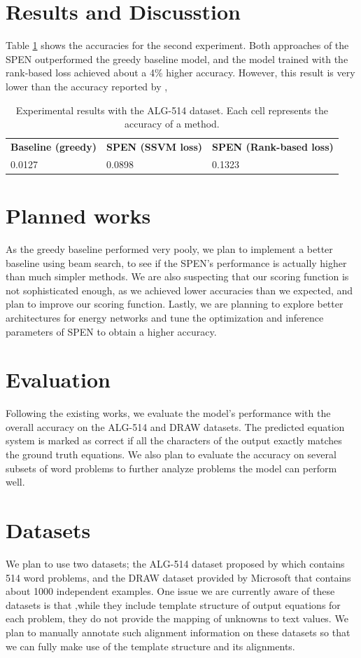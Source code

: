 \documentclass[11pt,letterpaper]{article}
\begin{document}
\section{Results and Discusstion}
Table \ref{result} shows the accuracies for the second experiment. Both approaches of the SPEN outperformed the greedy baseline model, and the model trained with the rank-based loss achieved about a 4\% higher accuracy. However, this result is very lower than the accuracy reported by \cite{Kushman2014LearningTA},
\begin{table}[]
\centering
\caption{Experimental results with the ALG-514 dataset. Each cell represents the accuracy of a method.}
\label{result}
\begin{tabular}{lll}
\textbf{Baseline (greedy)} & \textbf{SPEN (SSVM loss)} & \textbf{SPEN (Rank-based loss)} \\
0.0127                     & 0.0898                    & 0.1323                         
\end{tabular}
\end{table}
\section{Planned works}
As the greedy baseline performed very pooly, we plan to implement a better baseline using beam search, to see if the SPEN's performance is actually higher than much simpler methods. We are also suspecting that our scoring function is not sophisticated enough, as we achieved lower accuracies than we expected, and plan to improve our scoring function. Lastly, we are planning to explore better architectures for energy networks and tune the optimization and inference parameters of SPEN to obtain a higher accuracy.
\section{Evaluation}
Following the existing works, we evaluate the model's performance with the overall accuracy on the ALG-514 and DRAW datasets. The predicted equation system is marked as correct if all the characters of the output exactly matches the ground truth equations. We also plan to evaluate the accuracy on several subsets of word problems to further analyze problems the model can perform well.
\section{Datasets}
We plan to use two datasets; the ALG-514 dataset proposed by \cite{Kushman2014LearningTA} which contains 514 word problems, and the DRAW dataset provided by Microsoft that contains about 1000 independent examples. One issue we are currently aware of these datasets is that ,while they include template structure of output equations for each problem, they do not provide the mapping of unknowns to text values. We plan to manually annotate such alignment information on these datasets so that we can fully make use of the template structure and its alignments.
\end{document}

